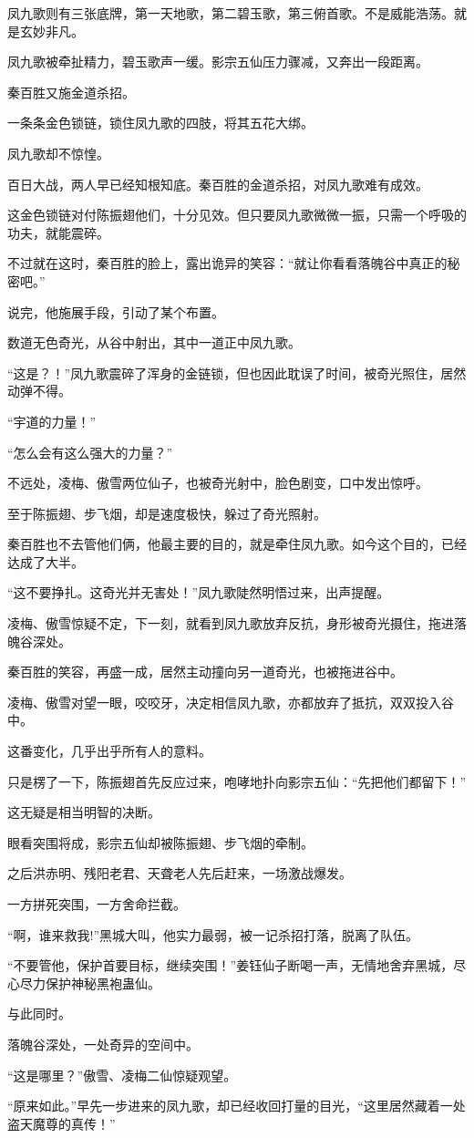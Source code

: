 \begin{this_body}
凤九歌则有三张底牌，第一天地歌，第二碧玉歌，第三俯首歌。不是威能浩荡。就是玄妙非凡。

凤九歌被牵扯精力，碧玉歌声一缓。影宗五仙压力骤减，又奔出一段距离。

秦百胜又施金道杀招。

一条条金色锁链，锁住凤九歌的四肢，将其五花大绑。

凤九歌却不惊惶。

百日大战，两人早已经知根知底。秦百胜的金道杀招，对凤九歌难有成效。

这金色锁链对付陈振翅他们，十分见效。但只要凤九歌微微一振，只需一个呼吸的功夫，就能震碎。

不过就在这时，秦百胜的脸上，露出诡异的笑容：“就让你看看落魄谷中真正的秘密吧。”

说完，他施展手段，引动了某个布置。

数道无色奇光，从谷中射出，其中一道正中凤九歌。

“这是？！”凤九歌震碎了浑身的金链锁，但也因此耽误了时间，被奇光照住，居然动弹不得。

“宇道的力量！”

“怎么会有这么强大的力量？”

不远处，凌梅、傲雪两位仙子，也被奇光射中，脸色剧变，口中发出惊呼。

至于陈振翅、步飞烟，却是速度极快，躲过了奇光照射。

秦百胜也不去管他们俩，他最主要的目的，就是牵住凤九歌。如今这个目的，已经达成了大半。

“这不要挣扎。这奇光并无害处！”凤九歌陡然明悟过来，出声提醒。

凌梅、傲雪惊疑不定，下一刻，就看到凤九歌放弃反抗，身形被奇光摄住，拖进落魄谷深处。

秦百胜的笑容，再盛一成，居然主动撞向另一道奇光，也被拖进谷中。

凌梅、傲雪对望一眼，咬咬牙，决定相信凤九歌，亦都放弃了抵抗，双双投入谷中。

这番变化，几乎出乎所有人的意料。

只是楞了一下，陈振翅首先反应过来，咆哮地扑向影宗五仙：“先把他们都留下！”

这无疑是相当明智的决断。

眼看突围将成，影宗五仙却被陈振翅、步飞烟的牵制。

之后洪赤明、残阳老君、天聋老人先后赶来，一场激战爆发。

一方拼死突围，一方舍命拦截。

“啊，谁来救我!”黑城大叫，他实力最弱，被一记杀招打落，脱离了队伍。

“不要管他，保护首要目标，继续突围！”姜钰仙子断喝一声，无情地舍弃黑城，尽心尽力保护神秘黑袍蛊仙。

与此同时。

落魄谷深处，一处奇异的空间中。

“这是哪里？”傲雪、凌梅二仙惊疑观望。

“原来如此。”早先一步进来的凤九歌，却已经收回打量的目光，“这里居然藏着一处盗天魔尊的真传！”

\end{this_body}

